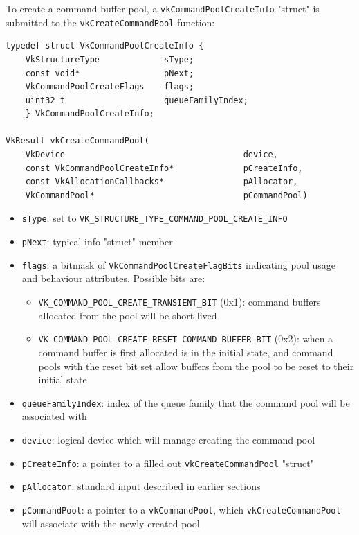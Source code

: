 \documentclass[12pt,letterpaper]{article}
\newcommand{\cil}[1]{\texttt{#1}}
\begin{document}
	To create a command buffer pool, a \cil{vkCommandPoolCreateInfo} "struct" is submitted to the \cil{vkCreateCommandPool} function:
	\begin{verbatim}
typedef struct VkCommandPoolCreateInfo {
	VkStructureType             sType;
	const void*                 pNext;
	VkCommandPoolCreateFlags    flags;
	uint32_t                    queueFamilyIndex;
	} VkCommandPoolCreateInfo;

VkResult vkCreateCommandPool(
    VkDevice                                    device,
    const VkCommandPoolCreateInfo*              pCreateInfo,
    const VkAllocationCallbacks*                pAllocator,
    VkCommandPool*                              pCommandPool)
	\end{verbatim}
		\begin{itemize}
			\item \cil{sType}: set to \cil{VK_STRUCTURE_TYPE_COMMAND_POOL_CREATE_INFO}
			
			\item \cil{pNext}: typical info "struct" member
			
			\item \cil{flags}: a bitmask of \cil{VkCommandPoolCreateFlagBits} indicating pool usage and behaviour attributes. Possible bits are:
				\begin{itemize}
					\item \cil{VK_COMMAND_POOL_CREATE_TRANSIENT_BIT} (0x1): command buffers allocated from the pool will be short-lived
					
					\item \cil{VK_COMMAND_POOL_CREATE_RESET_COMMAND_BUFFER_BIT} (0x2): when a command buffer is first allocated is in the initial state, and command pools with the reset bit set allow buffers from the pool to be reset to their initial state
				\end{itemize}
			
			\item \cil{queueFamilyIndex}: index of the queue family that the command pool will be associated with 
            
			\item \cil{device}: logical device which will manage creating the command pool
			
			\item \cil{pCreateInfo}: a pointer to a filled out \cil{vkCreateCommandPool} "struct"
			
			\item \cil{pAllocator}: standard input described in earlier sections
			
			\item \cil{pCommandPool}: a pointer to a \cil{vkCommandPool}, which \cil{vkCreateCommandPool} will associate with the newly created pool
		\end{itemize}
    
\end{document}
